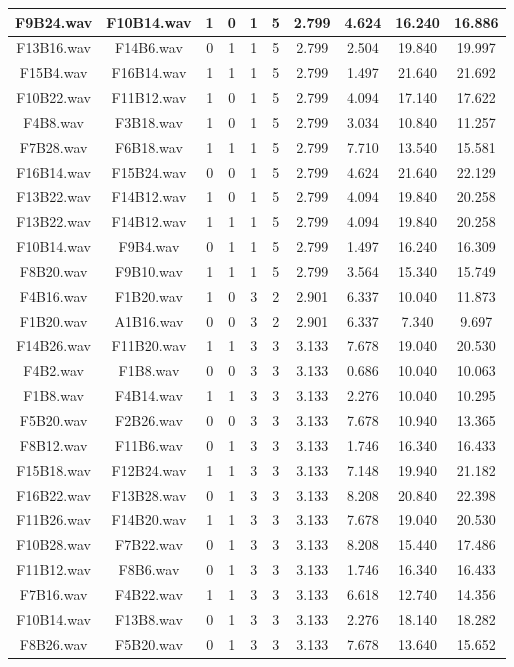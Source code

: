 \documentclass[11pt,a4paper,twoside]{book}
\begin{document}
\begin{longtable}[c]{|c|c|c|c|c|c|c|c|c|c|}
F9B24.wav&F10B14.wav&1&0&1&5&2.799&4.624&16.240&16.886\\ \hline
F13B16.wav&F14B6.wav&0&1&1&5&2.799&2.504&19.840&19.997\\ \hline
F15B4.wav&F16B14.wav&1&1&1&5&2.799&1.497&21.640&21.692\\ \hline
F10B22.wav&F11B12.wav&1&0&1&5&2.799&4.094&17.140&17.622\\ \hline
F4B8.wav&F3B18.wav&1&0&1&5&2.799&3.034&10.840&11.257\\ \hline
F7B28.wav&F6B18.wav&1&1&1&5&2.799&7.710&13.540&15.581\\ \hline
F16B14.wav&F15B24.wav&0&0&1&5&2.799&4.624&21.640&22.129\\ \hline
F13B22.wav&F14B12.wav&1&0&1&5&2.799&4.094&19.840&20.258\\ \hline
F13B22.wav&F14B12.wav&1&1&1&5&2.799&4.094&19.840&20.258\\ \hline
F10B14.wav&F9B4.wav&0&1&1&5&2.799&1.497&16.240&16.309\\ \hline
F8B20.wav&F9B10.wav&1&1&1&5&2.799&3.564&15.340&15.749\\ \hline
F4B16.wav&F1B20.wav&1&0&3&2&2.901&6.337&10.040&11.873\\ \hline
F1B20.wav&A1B16.wav&0&0&3&2&2.901&6.337&7.340&9.697\\ \hline
F14B26.wav&F11B20.wav&1&1&3&3&3.133&7.678&19.040&20.530\\ \hline
F4B2.wav&F1B8.wav&0&0&3&3&3.133&0.686&10.040&10.063\\ \hline
F1B8.wav&F4B14.wav&1&1&3&3&3.133&2.276&10.040&10.295\\ \hline
F5B20.wav&F2B26.wav&0&0&3&3&3.133&7.678&10.940&13.365\\ \hline
F8B12.wav&F11B6.wav&0&1&3&3&3.133&1.746&16.340&16.433\\ \hline
F15B18.wav&F12B24.wav&1&1&3&3&3.133&7.148&19.940&21.182\\ \hline
F16B22.wav&F13B28.wav&0&1&3&3&3.133&8.208&20.840&22.398\\ \hline
F11B26.wav&F14B20.wav&1&1&3&3&3.133&7.678&19.040&20.530\\ \hline
F10B28.wav&F7B22.wav&0&1&3&3&3.133&8.208&15.440&17.486\\ \hline
F11B12.wav&F8B6.wav&0&1&3&3&3.133&1.746&16.340&16.433\\ \hline
F7B16.wav&F4B22.wav&1&1&3&3&3.133&6.618&12.740&14.356\\ \hline
F10B14.wav&F13B8.wav&0&1&3&3&3.133&2.276&18.140&18.282\\ \hline
F8B26.wav&F5B20.wav&0&1&3&3&3.133&7.678&13.640&15.652\\ \hline

\end{longtable}
\end{document}
